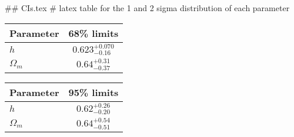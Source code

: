 ## CIs.tex
# latex table for the 1 and 2 sigma distribution of each parameter

\begin{tabular} { l  c}
 Parameter &  68\% limits\\
\hline
{\boldmath$h              $} & $0.623^{+0.070}_{-0.16}    $\\
{\boldmath$\Omega_m       $} & $0.64^{+0.31}_{-0.37}      $\\
\hline
\end{tabular}

\begin{tabular} { l  c}
 Parameter &  95\% limits\\
\hline
{\boldmath$h              $} & $0.62^{+0.26}_{-0.20}      $\\
{\boldmath$\Omega_m       $} & $0.64^{+0.54}_{-0.51}      $\\
\hline
\end{tabular}
